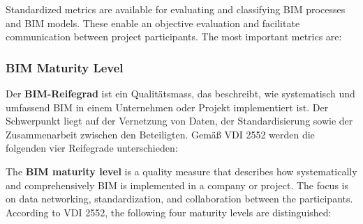 \begin{English}
    Standardized metrics are available for evaluating and classifying BIM processes and BIM models. These enable an objective evaluation and facilitate communication between project participants. The most important metrics are:
\end{English}

\subsubsection{BIM Maturity Level}
\begin{German}
    Der \textbf{BIM-Reifegrad} ist ein Qualitätsmass, das beschreibt, wie systematisch und umfassend BIM in einem Unternehmen oder Projekt implementiert ist. Der Schwerpunkt liegt auf der Vernetzung von Daten, der Standardisierung sowie der Zusammenarbeit zwischen den Beteiligten. Gemäß VDI 2552 werden die folgenden vier Reifegrade unterschieden: \cite{astourLehrbuchGrundlagenBIMArbeitsmethode2022,eichlerBIMcertHandbuchGrundlagenwissen2023}\\
\end{German}
\begin{English}
    The \textbf{BIM maturity level} is a quality measure that describes how systematically and comprehensively BIM is implemented in a company or project. The focus is on data networking, standardization, and collaboration between the participants. According to VDI 2552, the following four maturity levels are distinguished: \cite{astourLehrbuchGrundlagenBIMArbeitsmethode2022,eichlerBIMcertHandbuchGrundlagenwissen2023}\\
\end{English}

